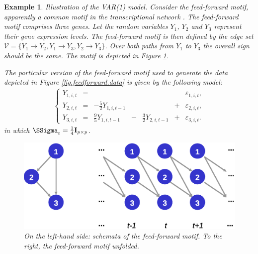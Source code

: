 \documentclass[a4paper]{article}
\theoremstyle{myexamplestyle}
\newtheorem{example}{Example}
\begin{document}
\begin{example} \label{example.feedforward.motif}
\textit{Illustration of the VAR(1) model.}
Consider the feed-forward motif, apparently a common motif in the transcriptional network \citep{Alon2007}. The feed-forward motif comprises three genes. Let the random variables $Y_1$, $Y_2$ and $Y_3$ represent their gene expression levels. The feed-forward motif is then defined by the edge set $\mathcal{V}  = \{ Y_1 \rightarrow Y_2, Y_1 \rightarrow Y_3, Y_2 \rightarrow Y_3 \}$. Over both paths from $Y_1$ to $Y_3$ the overall sign should be the same. The motif is depicted in Figure \ref{fig.feedforward.motif}.


The particular version of the feed-forward motif used to generate the data depicted in Figure \ref{fig.feedforward.data} is given by the following model:
\begin{eqnarray} \label{form.var1.3gene.feedforward}
\left\{
\begin{array}{rcrcrcr}
Y_{1,i,t} & = & & & & & \varepsilon_{1,i,t},
\\
Y_{2,i,t} & = & -\frac{5}{2} Y_{1,i,t-1} &  & & + & \varepsilon_{2,i,t},
\\
Y_{3,i,t} & = & \frac{9}{5} Y_{1,i,t-1} & - & \frac{3}{2} Y_{2,i,t-1} & + & \varepsilon_{3,i,t}.
\end{array}
\right.
\end{eqnarray}
in which $\SSigma_{\varepsilon} = \frac{1}{4} \mathbf{I}_{p \times p}$.


\begin{figure}[h!]
\begin{center}
\includegraphics[angle=0, scale=0.50]{feedforwardMotif.eps}
\end{center}
\caption{On the left-hand side: schemata of the feed-forward motif. To the right, the feed-forward motif unfolded. \label{fig.feedforward.motif}}
\end{figure}


\end{example}
\end{document}
